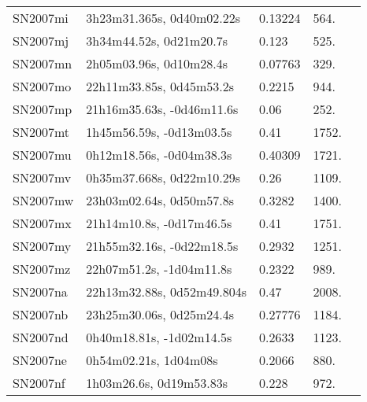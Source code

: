 \begin{longtable}{lllll}
         SN2007mi &      3h23m31.365s, 0d40m02.22s &  0.13224 &           564. &    \citet{2003SDSS1.C...0000:} \\
         SN2007mj &        3h34m44.52s, 0d21m20.7s &    0.123 &           525. &    \citet{2010ApJ...713.1026D} \\
         SN2007mn &        2h05m03.96s, 0d10m28.4s &  0.07763 &           329. &    \citet{2016SDSSD.C...0000:} \\
         SN2007mo &       22h11m33.85s, 0d45m53.2s &   0.2215 &           944. &    \citet{2011ApJ...740...92G} \\
         SN2007mp &      21h16m35.63s, -0d46m11.6s &     0.06 &           252. &    \citet{2007CBET.1102A...1B} \\
         SN2007mt &       1h45m56.59s, -0d13m03.5s &     0.41 &          1752. &  \citet{2012AandA...544A..81H} \\
         SN2007mu &       0h12m18.56s, -0d04m38.3s &  0.40309 &          1721. &    \citet{2011ApJ...740...92G} \\
         SN2007mv &      0h35m37.668s, 0d22m10.29s &     0.26 &          1109. &    \citet{2007CBET.1104A...1B} \\
         SN2007mw &       23h03m02.64s, 0d50m57.8s &   0.3282 &          1400. &    \citet{2011ApJ...740...92G} \\
         SN2007mx &       21h14m10.8s, -0d17m46.5s &     0.41 &          1751. &    \citet{2007CBET.1104A...1B} \\
         SN2007my &      21h55m32.16s, -0d22m18.5s &   0.2932 &          1251. &    \citet{2011ApJ...740...92G} \\
         SN2007mz &       22h07m51.2s, -1d04m11.8s &   0.2322 &           989. &    \citet{2011ApJ...740...92G} \\
         SN2007na &     22h13m32.88s, 0d52m49.804s &     0.47 &          2008. &    \citet{2007CBET.1104A...1B} \\
         SN2007nb &       23h25m30.06s, 0d25m24.4s &  0.27776 &          1184. &    \citet{2016SDSSD.C...0000:} \\
         SN2007nd &       0h40m18.81s, -1d02m14.5s &   0.2633 &          1123. &    \citet{2011ApJ...740...92G} \\
         SN2007ne &          0h54m02.21s, 1d04m08s &   0.2066 &           880. &    \citet{2011ApJ...740...92G} \\
         SN2007nf &        1h03m26.6s, 0d19m53.83s &    0.228 &           972. &    \citet{2011ApJ...740...92G} \\

\end{longtable}
